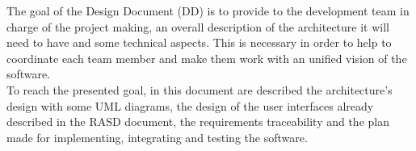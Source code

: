 The goal of the Design Document (DD) is to provide to the development team in charge of the project making, an overall description of the architecture it will need to have and some technical aspects. This is necessary in order to help to coordinate each team member and make them work with an unified vision of the software. \\
To reach the presented goal, in this document are described the architecture's design with some UML diagrams, the design of the user interfaces already described in the RASD document, the requirements traceability and the plan made for implementing, integrating and testing the software.

